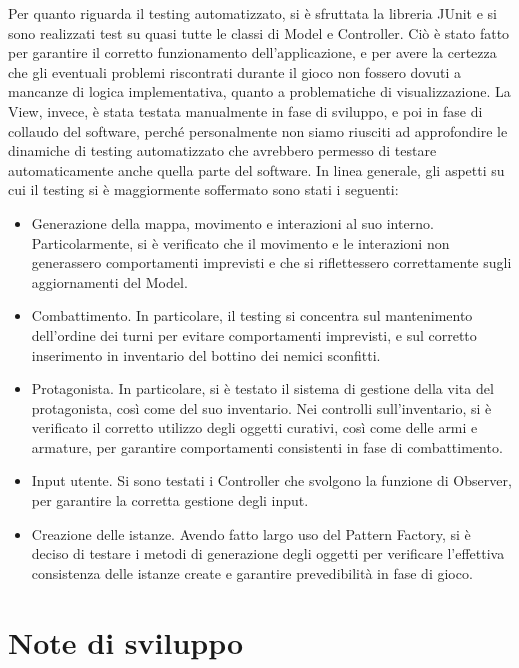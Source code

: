 \documentclass[a4paper,12pt]{report}
\begin{document}
Per quanto riguarda il testing automatizzato, si è sfruttata la libreria JUnit e si sono realizzati test su quasi tutte le classi di Model e Controller. Ciò è stato fatto per garantire il corretto funzionamento dell’applicazione, e per avere la certezza che gli eventuali problemi riscontrati durante il gioco non fossero dovuti a mancanze di logica implementativa, quanto a problematiche di visualizzazione. 
%
\newline La View, invece, è stata testata manualmente in fase di sviluppo, e poi in fase di collaudo del software, perché personalmente non siamo riusciti ad approfondire le dinamiche di testing automatizzato che avrebbero permesso di testare automaticamente anche quella parte del software.
%
\newline In linea generale, gli aspetti su cui il testing si è maggiormente soffermato sono stati i seguenti:

\begin{itemize}
	\item Generazione della mappa, movimento e interazioni al suo interno. Particolarmente, si è verificato che il movimento e le interazioni non generassero comportamenti imprevisti e che si riflettessero correttamente sugli aggiornamenti del Model.
	\item Combattimento. In particolare, il testing si concentra sul mantenimento dell’ordine dei turni per evitare comportamenti imprevisti, e sul corretto inserimento in inventario del bottino dei nemici sconfitti.
	\item Protagonista. In particolare, si è testato il sistema di gestione della vita del protagonista, così come del suo inventario. Nei controlli sull’inventario, si è verificato il corretto utilizzo degli oggetti curativi, così come delle armi e armature, per garantire comportamenti consistenti in fase di combattimento.
	\item Input utente. Si sono testati i Controller che svolgono la funzione di Observer, per garantire la corretta gestione degli input.
	\item Creazione delle istanze. Avendo fatto largo uso del Pattern Factory, si è deciso di testare i metodi di generazione degli oggetti per verificare l’effettiva consistenza delle istanze create e garantire prevedibilità in fase di gioco.
\end{itemize}

\section{Note di sviluppo}
\end{document}
